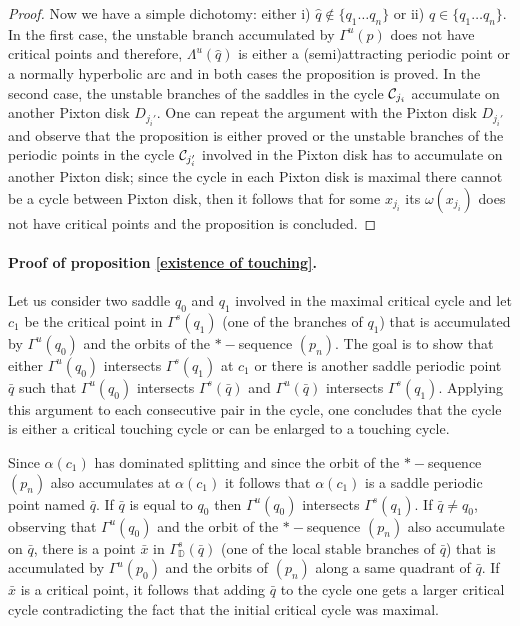 \documentclass[a4paper,11pt]{article}
\theoremstyle{definition}
\def\DD{{\mathbb D}}
\def\La{\Lambda}
\def\Ga{\Gamma}
\def\La{\Lambda}
\def\al{\alpha}
\def\Ga{\Gamma}
\begin{document}
\begin{proof}
Now we have a simple dichotomy: either i) $\hat q\notin \{q_1\dots q_n\}$ or ii) $\hat q\in \{q_1\dots q_n\}$. In the first case, the unstable branch accumulated by $\Ga^u(p)$ does not have critical points and therefore, $\La^u(\hat q)$ is either a (semi)attracting periodic point or a normally hyperbolic arc and in both cases the proposition is proved.  In the second case,  the unstable branches of the saddles in the cycle ${\cal C}_{j_i}$  accumulate on  another Pixton disk $D_{j_i'}$. One can repeat the argument with the Pixton disk $D_{j_i'}$ and observe that the proposition is either proved  or the unstable branches of the periodic points in the cycle ${\cal C}_{j_i'}$ involved in the  Pixton disk has to accumulate on another Pixton disk;   since the cycle in each Pixton disk is maximal there cannot be a cycle between Pixton disk, then it follows that for some $x_{j_i}$ its $\omega(x_{j_i})$ does not have critical points and the proposition is concluded.






\end{proof}



\paragraph{Proof of proposition \ref{existence of touching}.} 

Let us consider two saddle $q_0$ and $q_1$ involved in the maximal critical cycle and let $c_1$ be the critical point in  $\Gamma^s(q_1)$ (one of the branches of $q_1$) that is accumulated by $\Gamma^u(q_0)$ and the orbits of the $*-$sequence $(p_n)$. The goal is to show that either $\Gamma^u(q_0)$ intersects $\Gamma^s(q_1)$ at $c_1$ or there is another saddle  periodic point $\bar q$ such that $\Gamma^u(q_0)$ intersects $\Gamma^s(\bar q)$ and  $\Gamma^u(\bar q)$ intersects $\Gamma^s(q_1).$ Applying this argument to each consecutive pair in the cycle, one concludes that the cycle is either a critical touching cycle or can be enlarged to a touching cycle. 

Since $\al(c_1)$ has dominated splitting and since the orbit of the $*-$sequence $(p_n)$ also accumulates at $\alpha(c_1)$ it follows that $\al(c_1)$ is a saddle periodic point named $\bar q$.  If $\bar q$ is equal to $q_0$ then $\Ga^u(q_0)$ intersects $\Ga^s(q_1)$. If $\bar q\neq  q_0$, observing that $\Ga^u(q_0)$ and the orbit of the $*-$sequence $(p_n)$ also accumulate on $\bar q$,  there is a point $\bar x$ in $\Ga^s_\DD(\bar q)$ (one of the local stable branches of $\bar q$) that is accumulated by $\Ga^u(p_0)$ and the orbits of $(p_n)$ along a same quadrant of $\bar q.$ If $\bar x$ is a critical point, it follows that adding $\bar q$ to the cycle one gets a larger critical cycle contradicting the fact that the initial critical cycle was  maximal.
\end{document}

